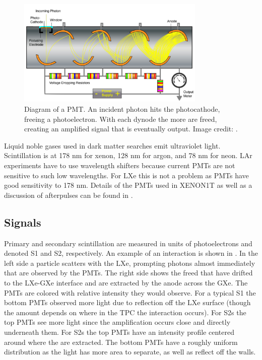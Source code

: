 \begin{figure}
\centering
\includegraphics[width=0.8\textwidth]{PMT1Better}
\caption{Diagram of a PMT.  An incident photon hits the photocathode, freeing a photoelectron.  With each dynode the more \electron are
freed, creating an amplified signal that is eventually output.  Image credit: .}
\label{fig:tpcs_pmts_pmt_diagram}
\end{figure}

Liquid noble gases used in dark matter searches emit ultraviolet light.  Scintillation is at 178 nm for xenon, 128 nm for argon, and
78 nm for neon.  LAr experiments have to use wavelength shifters because current PMTs are not sensitive to such low wavelengths.  For
LXe this is not a problem as PMTs have good sensitivity to 178 nm.  Details of the PMTs used in XENON1T as well as a discussion of
afterpulses can be found in .



\subsection{Signals}
\label{subsec:tpcs_signals}
Primary and secondary scintillation are measured in units of photoelectrons and denoted S1 and S2, respectively.  An example of an
interaction is shown in .  In the left side a particle scatters with the LXe, prompting photons almost
immediately that are observed by the PMTs.  The right side shows the freed \electron that have drifted to the LXe-GXe interface and
are extracted by the anode across the GXe.  The PMTs are colored with relative intensity they would observe.  For a typical S1 the
bottom PMTs observed more light due to reflection off the LXe surface (though the amount depends on where in the TPC the interaction
occurs).  For S2s the top PMTs see more light since the amplification occurs close and directly underneath them.  For S2s
the top PMTs have an intensity profile centered around where the \electron are extracted.  The bottom PMTs have a roughly uniform
distribution as the light has more area to separate, as well as reflect off the walls.

